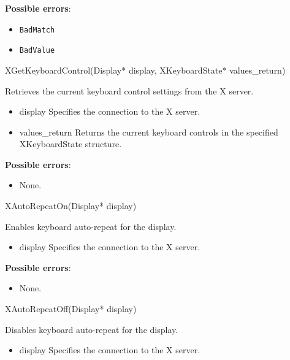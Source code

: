 \documentclass{report}
\begin{document}
\begin{itemize}
        \textbf{Possible errors}:
        \begin{itemize}
            \item \texttt{BadMatch}
            \item \texttt{BadValue}
        \end{itemize}

        \begin{cppcode}
        XGetKeyboardControl(Display* display, XKeyboardState* values_return)
        \end{cppcode}
        \bigbreak \noindent
        Retrieves the current keyboard control settings from the X server.

        \begin{itemize}
            \item display Specifies the connection to the X server.
            \item values\_return Returns the current keyboard controls in the specified XKeyboardState structure.
        \end{itemize}

        \textbf{Possible errors}:
        \begin{itemize}
            \item None.
        \end{itemize}

        \begin{cppcode}
            XAutoRepeatOn(Display* display)
        \end{cppcode}
        \bigbreak \noindent
        Enables keyboard auto-repeat for the display.

        \begin{itemize}
            \item display Specifies the connection to the X server.
        \end{itemize}

        \textbf{Possible errors}:
        \begin{itemize}
            \item None.
        \end{itemize}

        \begin{cppcode}
            XAutoRepeatOff(Display* display)
        \end{cppcode}
        \bigbreak \noindent
        Disables keyboard auto-repeat for the display.

        \begin{itemize}
            \item display Specifies the connection to the X server.
        \end{itemize}


\end{itemize}
\end{document}
